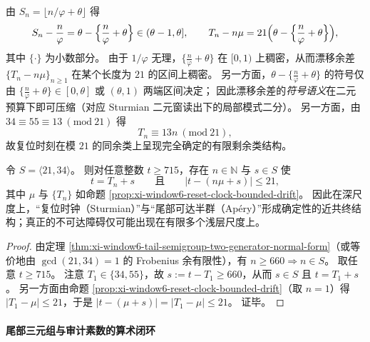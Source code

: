 \begin{remark}[漂移余差的旋转表示与同余不变量]\label{rem:xi-window6-reset-clock-residual-rotation-congruence}
由 \(S_n=\lfloor n/\varphi+\theta\rfloor\) 得
\[
S_n-\frac{n}{\varphi}=\theta-\Bigl\{\frac{n}{\varphi}+\theta\Bigr\}\in(\theta-1,\theta],
\qquad
T_n-n\mu=21\Bigl(\theta-\Bigl\{\frac{n}{\varphi}+\theta\Bigr\}\Bigr),
\]
其中 \(\{\cdot\}\) 为小数部分。
由于 \(1/\varphi\) 无理，\(\{\frac{n}{\varphi}+\theta\}\) 在 \([0,1)\) 上稠密，从而漂移余差 \(\{T_n-n\mu\}_{n\ge 1}\) 在某个长度为 \(21\) 的区间上稠密。
另一方面，\(\theta-\{\frac{n}{\varphi}+\theta\}\) 的符号仅由
\(\{\frac{n}{\varphi}+\theta\}\in[0,\theta]\) 或 \((\theta,1)\) 两端区间决定；
因此漂移余差的\emph{符号语义}在二元预算下即可压缩（对应 Sturmian 二元窗读出下的局部模式二分）。
另一方面，由 \(34\equiv 55\equiv 13\ (\mathrm{mod}\ 21)\) 得
\[
T_n\equiv 13n\ (\mathrm{mod}\ 21),
\]
故复位时刻在模 \(21\) 的同余类上呈现完全确定的有限剩余类结构。
\end{remark}

\begin{corollary}\label{cor:xi-window6-reset-clock-semigroup-coupling}
令 \(S=\langle 21,34\rangle\)。
则对任意整数 \(t\ge 715\)，存在 \(n\in\mathbb N\) 与 \(s\in S\) 使
\[
t=T_n+s
\qquad\text{且}\qquad
\bigl|t-(n\mu+s)\bigr|\le 21,
\]
其中 \(\mu\) 与 \(\{T_n\}\) 如命题 \ref{prop:xi-window6-reset-clock-bounded-drift}。
因此在深尺度上，“复位时钟（Sturmian）”与“尾部可达半群（Ap\'ery）”形成确定性的近共终结构；真正的不可达障碍仅可能出现在有限多个浅层尺度上。
\end{corollary}

\begin{proof}
由定理 \ref{thm:xi-window6-tail-semigroup-two-generator-normal-form}（或等价地由 \(\gcd(21,34)=1\) 的 Frobenius 余有限性），有 \(n\ge 660\Rightarrow n\in S\)。
取任意 \(t\ge 715\)。
注意 \(T_1\in\{34,55\}\)，故 \(s:=t-T_1\ge 660\)，从而 \(s\in S\) 且 \(t=T_1+s\)。
另一方面由命题 \ref{prop:xi-window6-reset-clock-bounded-drift}（取 \(n=1\)）得
\(
|T_1-\mu|\le 21
\)，于是
\(
|t-(\mu+s)|=|T_1-\mu|\le 21
\)。
证毕。
\end{proof}

\paragraph{尾部三元组与审计素数的算术闭环}

